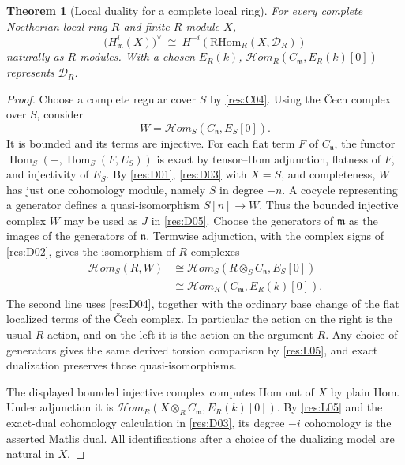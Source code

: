 \documentclass[11pt,oneside,openany]{book}
\newtheorem{theorem}{Theorem}[chapter]
\theoremstyle{definition}
\theoremstyle{remark}
\begin{document}
\begin{theorem}[Local duality for a complete local ring]\label{res:D06}
For every complete Noetherian local ring $R$ and finite $R$-module $X$,
\[
 \bigl(H^i_{\mathfrak m}(X)\bigr)^\vee
     \ \cong\ H^{-i}\!\left(\mathrm{RHom}_R(X,\mathcal D_R)\right)
\]
naturally as $R$-modules. With a chosen $E_R(k)$,
$\mathcal H om_R(C_{\mathfrak m},E_R(k)[0])$ represents
$\mathcal D_R$.
\end{theorem}
\begin{proof}
Choose a complete regular cover $S$ by \ref{res:C04}.
Using the \v{C}ech complex over $S$, consider
\[
                W=\mathcal H om_S(C_{\mathfrak n},E_S[0]).
\]
It is bounded and its terms are injective. For each flat term
$F$ of $C_{\mathfrak n}$, the functor
$\operatorname{Hom}_S(-,\operatorname{Hom}_S(F,E_S))$
is exact by tensor--Hom adjunction, flatness of $F$, and
injectivity of $E_S$. By \ref{res:D01}, \ref{res:D03} with
$X=S$, and completeness, $W$ has just one cohomology module,
namely $S$ in degree $-n$. A cocycle representing a generator
defines a quasi-isomorphism $S[n]\to W$. Thus the bounded
injective complex $W$ may be used as $J$ in \ref{res:D05}.
Choose the generators of $\mathfrak m$ as the images of the
generators of $\mathfrak n$. Termwise adjunction, with the
complex signs of \ref{res:D02}, gives the isomorphism of
$R$-complexes
\[
 \begin{aligned}
 \mathcal H om_S(R,W)
 &\cong \mathcal H om_S(R\otimes_S C_{\mathfrak n},E_S[0])\\
 &\cong \mathcal H om_R(C_{\mathfrak m},E_R(k)[0]).
 \end{aligned}
\]
The second line uses \ref{res:D04}, together with the ordinary
base change of the flat localized terms of the \v{C}ech complex.
In particular the action on the right is the usual $R$-action,
and on the left it is the action on the argument $R$.
Any choice of generators gives the same derived torsion
comparison by \ref{res:L05}, and exact dualization preserves
those quasi-isomorphisms.

The displayed bounded injective complex computes Hom out of $X$
by plain Hom. Under adjunction it is
$\mathcal H om_R(X\otimes_R C_{\mathfrak m},E_R(k)[0])$.
By \ref{res:L05} and the exact-dual cohomology calculation in
\ref{res:D03}, its degree $-i$ cohomology is the asserted
Matlis dual. All identifications after a choice of the dualizing
model are natural in $X$.
\end{proof}
\end{document}
